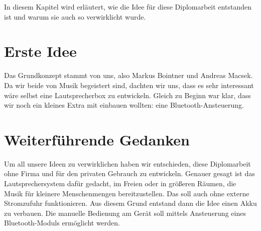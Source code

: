 In diesem Kapitel wird erläutert, wie die Idee für diese Diplomarbeit entstanden ist und warum sie auch so verwirklicht wurde.

\section{Erste Idee} \label{sec:1.1}
Das Grundkonzept stammt von uns, also Markus Bointner und Andreas Macsek. Da wir beide von Musik begeistert sind, dachten wir uns, dass es sehr interessant wäre selbst eine Lautsprecherbox zu entwickeln. Gleich zu Beginn war klar, dass wir noch ein kleines Extra mit einbauen wollten: eine Bluetooth-Ansteuerung.

\section{Weiterführende Gedanken} \label{sec:1.2}
Um all unsere Ideen zu verwirklichen haben wir entschieden, diese Diplomarbeit ohne Firma und für den privaten Gebrauch zu entwickeln. Genauer gesagt ist das Lautsprechersystem dafür gedacht, im Freien oder in größeren Räumen, die Musik für kleinere Menschenmengen bereitzustellen. Das soll auch ohne externe Stromzufuhr funktionieren. Aus diesem Grund entstand dann die Idee einen Akku zu verbauen. Die manuelle Bedienung am Gerät soll mittels Ansteuerung eines Bluetooth-Moduls ermöglicht werden.
